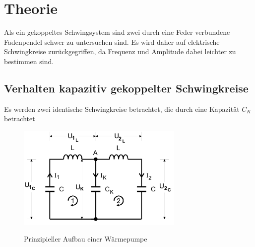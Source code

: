 \section{Theorie}
\label{sec:Theorie}

Als ein gekoppeltes Schwingsystem sind zwei durch eine Feder verbundene Fadenpendel schwer zu untersuchen sind.
Es wird daher auf elektrische Schwingkreise zurückgegriffen, da Frequenz und Amplitude dabei leichter zu bestimmen sind.

\subsection {Verhalten kapazitiv gekoppelter Schwingkreise}

Es werden zwei identische Schwingkreise betrachtet, die durch eine Kapazität $C_{K}$ betrachtet

\begin{figure} 
    \centering
    \includegraphics[width=8cm] {pictures/prinzipschaltbild.png} \cite{v308} 
    \caption{Prinzipieller Aufbau einer Wärmepumpe}
    \label{fig:prinzipschaltbild}
\end{figure} 